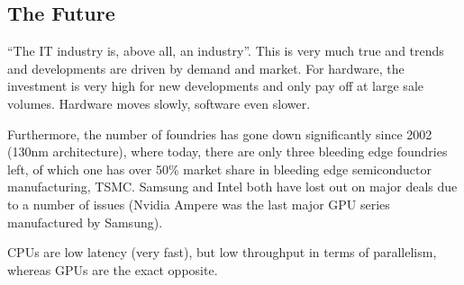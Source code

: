 \subsection{The Future}
``The IT industry is, above all, an industry''. This is very much true and trends and developments are driven by demand and market.
For hardware, the investment is very high for new developments and only pay off at large sale volumes.
Hardware moves slowly, software even slower.

Furthermore, the number of foundries has gone down significantly since 2002 (130nm architecture),
where today, there are only three bleeding edge foundries left, of which one has over 50\% market share in bleeding edge semiconductor manufacturing, TSMC.
Samsung and Intel both have lost out on major deals due to a number of issues (Nvidia Ampere was the last major GPU series manufactured by Samsung).

CPUs are low latency (very fast), but low throughput in terms of parallelism, whereas GPUs are the exact opposite.
